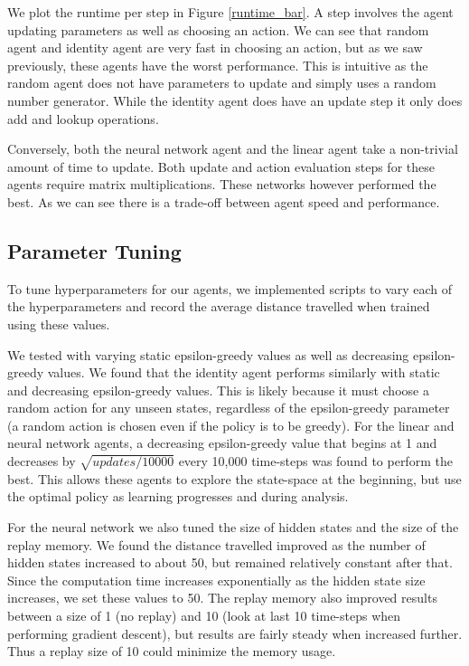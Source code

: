 \documentclass[12pt]{article}
\begin{document}
We plot the runtime per step in Figure \ref{runtime_bar}. A step involves the agent updating parameters as well as choosing an action. We can see that random agent and identity agent are very fast in choosing an action, but as we saw previously, these agents have the worst performance. This is intuitive as the random agent does not have parameters to update and simply uses a random number generator. While the identity agent does have an update step it only does add and lookup operations.

Conversely, both the neural network agent and the linear agent take a non-trivial amount of time to update. Both update and action evaluation steps for these agents require matrix multiplications. These networks however performed the best. As we can see there is a trade-off between agent speed and performance.

\subsection{Parameter Tuning}

To tune hyperparameters for our agents, we implemented scripts to vary each of the hyperparameters and record the average distance travelled when trained using these values. 

We tested with varying static epsilon-greedy values as well as decreasing epsilon-greedy values. We found that the identity agent performs similarly with static and decreasing epsilon-greedy values. This is likely because it must choose a random action for any unseen states, regardless of the epsilon-greedy parameter (a random action is chosen even if the policy is to be greedy). For the linear and neural network agents, a decreasing epsilon-greedy value that begins at 1 and decreases by $\sqrt{updates / 10000}$ every 10,000 time-steps was found to perform the best. This allows these agents to explore the state-space at the beginning, but use the optimal policy as learning progresses and during analysis.

For the neural network we also tuned the size of hidden states and the size of the replay memory. We found the distance travelled improved as the number of hidden states increased to about 50, but remained relatively constant after that. Since the computation time increases exponentially as the hidden state size increases, we set these values to 50. The replay memory also improved results between a size of 1 (no replay) and 10 (look at last 10 time-steps when performing gradient descent), but results are fairly steady when increased further. Thus a replay size of 10 could minimize the memory usage.
\end{document}
